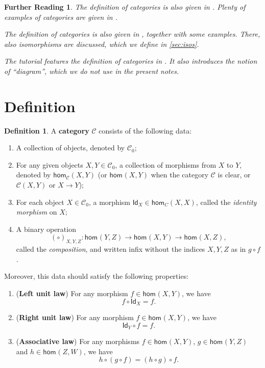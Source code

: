 \documentclass[a4paper,11pt, oneside,titlepage=false]{scrbook}
\theoremstyle{plain}
\newtheorem*{reading*}{Further Reading}
\theoremstyle{definition}
\newtheorem{dfn}[thm]{Definition}
\newcommand{\cfont}[1]{\ensuremath{\mathsf{#1}}}
\newcommand{\Cat}[1]{\mathcal{#1}}
\newcommand{\CC}{\Cat{C}}
\newcommand{\Ob}[1]{{#1}_0}
\newcommand{\Hom}[3][]{\cfont{hom}_{#1}(#2,#3)}
\newcommand{\CHom}[3]{{#1}(#2,#3)}
\newcommand{\Id}[1][]{\cfont{Id}_{#1}}
\newcommand{\co}[2]{\ensuremath{#2 \circ #1}}
\begin{document}
\begin{reading*}
The definition of categories is also given in \cite[\S 2.1]{barr-wells}. Plenty of examples of categories are given in \cite[\S\S 2.3--2.5]{barr-wells}.

  The definition of categories is also given in \cite[\S 1.1]{leinster}, together with some examples.
  There, also isomorphisms are discussed, which we define in \cref{sec:isos}.

  The tutorial \cite{pierce} features the definition of categories in \cite[\S 2.1]{pierce}.
  It also introduces the notion of ``diagram'', which we do not use in the present notes.
\end{reading*}


\section{Definition}

\begin{dfn}\label{dfn:category}
  A \textbf{category} $\CC$ consists of the following data:
\begin{enumerate}
\item A collection of objects, denoted by $\Ob{\CC}$;
\item For any given objects $X,Y \in \Ob{\CC}$, a collection of morphisms from $X$ to $Y$, denoted by $\Hom[\CC]{X}{Y}$ (or $\Hom{X}{Y}$ when the category $\CC$ is clear, or $\CHom \CC X Y$ or $X \to Y$);
\item For each object $X\in \Ob{\CC}$, a morphism $\Id[X] \in \Hom[C]{X}{X}$, called the \emph{identity morphism} on $X$;
\item A binary operation
\[
(\co{}{})_{X,Y,Z} : \Hom{Y}{Z} \to \Hom X Y \to \Hom X Z,
\]
called the \emph{composition}, and written infix without the indices $X,Y,Z$ as in $\co{f}{g}$.
\end{enumerate}
Moreover, this data should satisfy the following properties:
\begin{enumerate}
\item (\textbf{Left unit law}) For any morphism $f \in \Hom X Y$, we have 
\[
 \co{\Id[X]} {f} = f.
\]
\item (\textbf{Right unit law}) For any morphism $f \in \Hom X Y$, we have 
\[
  \co f {\Id[Y]} = f.
\]
\item (\textbf{Associative law}) For any morphisms $f\in \Hom X Y$, $g\in \Hom Y Z$ and $h\in \Hom Z W$, we have
\[
     \co {(\co f g)}{h} =  \co f {(\co g  h)}.
\]
\end{enumerate}
\end{dfn}
\end{document}
